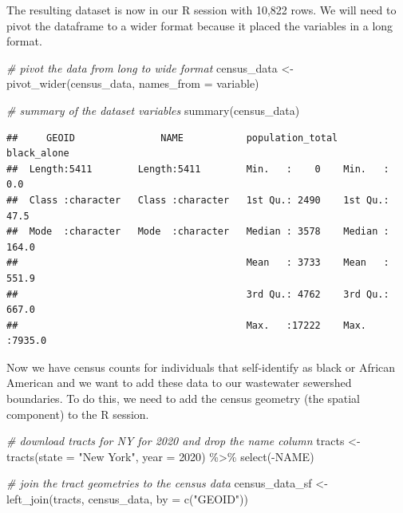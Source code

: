 \documentclass[
]{book}
\newenvironment{Shaded}{\begin{snugshade}}{\end{snugshade}}
\newcommand{\AttributeTok}[1]{\textcolor[rgb]{0.77,0.63,0.00}{#1}}
\newcommand{\CommentTok}[1]{\textcolor[rgb]{0.56,0.35,0.01}{\textit{#1}}}
\newcommand{\DecValTok}[1]{\textcolor[rgb]{0.00,0.00,0.81}{#1}}
\newcommand{\FunctionTok}[1]{\textcolor[rgb]{0.00,0.00,0.00}{#1}}
\newcommand{\NormalTok}[1]{#1}
\newcommand{\OtherTok}[1]{\textcolor[rgb]{0.56,0.35,0.01}{#1}}
\newcommand{\SpecialCharTok}[1]{\textcolor[rgb]{0.00,0.00,0.00}{#1}}
\newcommand{\StringTok}[1]{\textcolor[rgb]{0.31,0.60,0.02}{#1}}
\begin{document}
The resulting dataset is now in our R session with 10,822 rows. We will need to pivot the dataframe to a wider format because it placed the variables in a long format.

\begin{Shaded}
\begin{Highlighting}[]
\CommentTok{\# pivot the data from long to wide format}
\NormalTok{census\_data }\OtherTok{\textless{}{-}} \FunctionTok{pivot\_wider}\NormalTok{(census\_data,}
                           \AttributeTok{names\_from =}\NormalTok{ variable)}

\CommentTok{\# summary of the dataset variables}
\FunctionTok{summary}\NormalTok{(census\_data)}
\end{Highlighting}
\end{Shaded}

\begin{verbatim}
##     GEOID               NAME           population_total  black_alone    
##  Length:5411        Length:5411        Min.   :    0    Min.   :   0.0  
##  Class :character   Class :character   1st Qu.: 2490    1st Qu.:  47.5  
##  Mode  :character   Mode  :character   Median : 3578    Median : 164.0  
##                                        Mean   : 3733    Mean   : 551.9  
##                                        3rd Qu.: 4762    3rd Qu.: 667.0  
##                                        Max.   :17222    Max.   :7935.0
\end{verbatim}

Now we have census counts for individuals that self-identify as black or African American and we want to add these data to our wastewater sewershed boundaries. To do this, we need to add the census geometry (the spatial component) to the R session.

\begin{Shaded}
\begin{Highlighting}[]
\CommentTok{\# download tracts for NY for 2020 and drop the name column}
\NormalTok{tracts }\OtherTok{\textless{}{-}} \FunctionTok{tracts}\NormalTok{(}\AttributeTok{state =} \StringTok{"New York"}\NormalTok{, }\AttributeTok{year =} \DecValTok{2020}\NormalTok{) }\SpecialCharTok{\%\textgreater{}\%} \FunctionTok{select}\NormalTok{(}\SpecialCharTok{{-}}\NormalTok{NAME) }

\CommentTok{\# join the tract geometries to the census data}
\NormalTok{census\_data\_sf }\OtherTok{\textless{}{-}} \FunctionTok{left\_join}\NormalTok{(tracts, census\_data, }\AttributeTok{by =} \FunctionTok{c}\NormalTok{(}\StringTok{"GEOID"}\NormalTok{))}
\end{Highlighting}
\end{Shaded}
\end{document}
